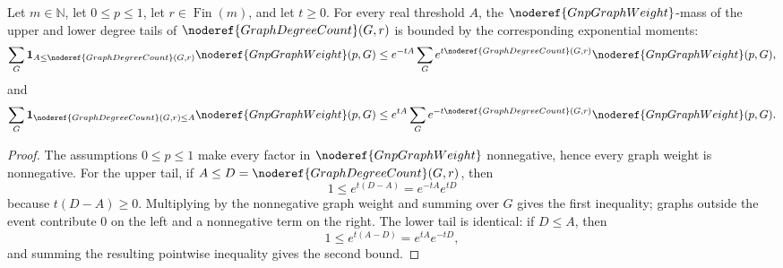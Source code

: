 \begin{helper}[GnpVertexDegreeMarkovTailBounds]
Let \(m\in\mathbb N\), let \(0\le p\le1\), let
\(r\in\operatorname{Fin}(m)\), and let \(t\ge0\).  For every real threshold
\(A\), the \(\noderef{GnpGraphWeight}\)-mass of the upper and lower degree
tails of \(\noderef{GraphDegreeCount}(G,r)\) is bounded by the corresponding
exponential moments:
\[
\sum_G {\bf 1}_{A\le \noderef{GraphDegreeCount}(G,r)}
  \noderef{GnpGraphWeight}(p,G)
\le
e^{-tA}\sum_G e^{t\noderef{GraphDegreeCount}(G,r)}
  \noderef{GnpGraphWeight}(p,G),
\]
and
\[
\sum_G {\bf 1}_{\noderef{GraphDegreeCount}(G,r)\le A}
  \noderef{GnpGraphWeight}(p,G)
\le
e^{tA}\sum_G e^{-t\noderef{GraphDegreeCount}(G,r)}
  \noderef{GnpGraphWeight}(p,G).
\]
\end{helper}
\begin{proof}
The assumptions \(0\le p\le1\) make every factor in
\(\noderef{GnpGraphWeight}\) nonnegative, hence every graph weight is
nonnegative.  For the upper tail, if
\(A\le D=\noderef{GraphDegreeCount}(G,r)\), then
\[
1\le e^{t(D-A)}=e^{-tA}e^{tD}
\]
because \(t(D-A)\ge0\).  Multiplying by the nonnegative graph weight and
summing over \(G\) gives the first inequality; graphs outside the event
contribute \(0\) on the left and a nonnegative term on the right.  The lower
tail is identical: if \(D\le A\), then
\[
1\le e^{t(A-D)}=e^{tA}e^{-tD},
\]
and summing the resulting pointwise inequality gives the second bound.
\end{proof}
